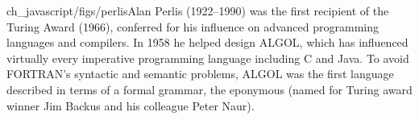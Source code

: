 \begin{sidebargraphic}{ch_javascript/figs/perlis}{Alan Perlis}
  (1922--1990) was the first recipient of the Turing Award (1966), conferred
  for his influence on advanced programming languages and compilers.
  In 1958 he helped design ALGOL,
  which has influenced virtually every imperative programming language
  including C and Java.  To avoid FORTRAN's
  syntactic and semantic problems, ALGOL was the first language
  described in terms of a formal grammar, the eponymous
   (named for Turing award
  winner Jim Backus and his colleague Peter Naur).
\end{sidebargraphic}